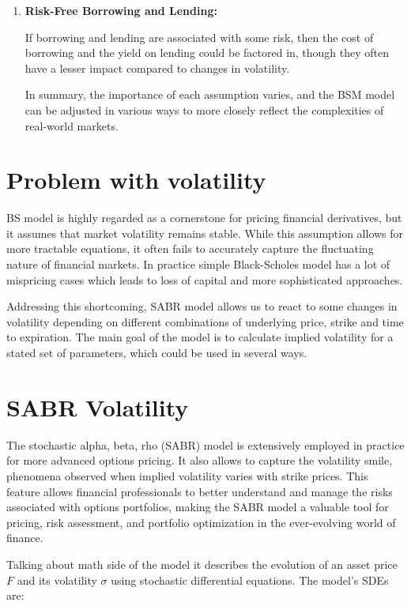 \documentclass[a4paper,fleqn,12pt]{extarticle}
\begin{document}
\begin{enumerate}
		\item \textbf{Risk-Free Borrowing and Lending:}

		If borrowing and lending are associated with some risk, then the cost of borrowing and the yield on lending could be factored in, though they often have a lesser impact compared to changes in volatility.
		
		
		In summary, the importance of each assumption varies, and the BSM model can be adjusted in various ways to more closely reflect the complexities of real-world markets.
	\end{enumerate}
	
	
	\newpage
	\section{Problem with volatility}
	
	BS model is highly regarded as a cornerstone for pricing financial derivatives, but it assumes that market volatility remains stable. While this assumption allows for more tractable equations, it often fails to accurately capture the fluctuating nature of financial markets. In practice simple Black-Scholes model has a lot of mispricing cases which leads to loss of capital and more sophisticated approaches.
	
	Addressing this shortcoming, SABR model allows us to react to some changes in volatility depending on different combinations of underlying price, strike and time to expiration. The main goal of the model is to calculate implied volatility for a stated set of parameters, which could be used in several ways.
	
	\section{SABR Volatility }

	The stochastic alpha, beta, rho (SABR) model is extensively employed in practice for more advanced options pricing. It also allows to capture the volatility smile, phenomena observed when implied volatility varies with strike prices. This feature allows financial professionals to better understand and manage the risks associated with options portfolios, making the SABR model a valuable tool for pricing, risk assessment, and portfolio optimization in the ever-evolving world of finance.

	Talking about math side of the model it describes the evolution of an asset price $F$ and its volatility $\sigma$ using stochastic differential equations. The model's SDEs are:
\end{document}
